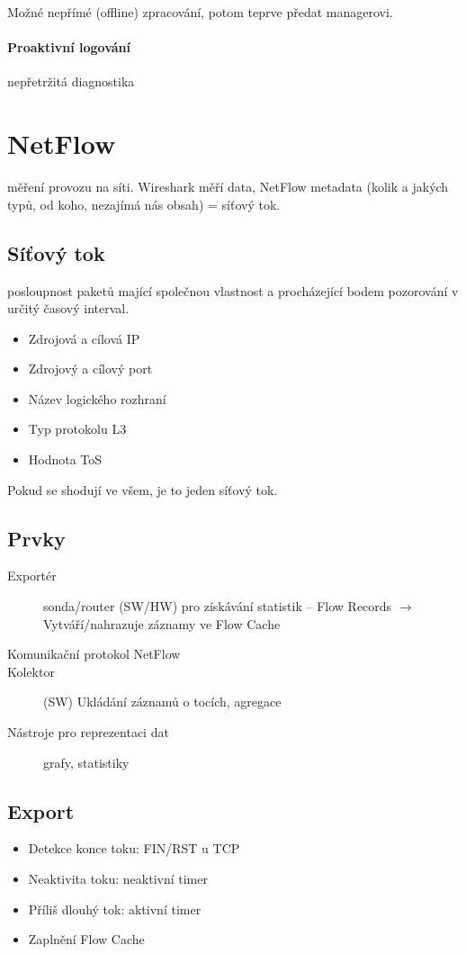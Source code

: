 \documentclass[a4paper, 11pt]{report}
\begin{document}
Možné nepřímé (offline) zpracování, potom teprve předat managerovi.

\paragraph{Proaktivní logování} nepřetržitá diagnostika

\section{NetFlow}
měření provozu na síti. Wireshark měří data, NetFlow metadata (kolik a jakých typů, od koho, nezajímá nás obsah) = síťový tok.

\subsection{Síťový tok}
posloupnost paketů mající společnou vlastnost  a procházející bodem pozorování v určitý časový interval.
\begin{itemize}
	\item Zdrojová a cílová IP
	\item Zdrojový a cílový port
	\item Název logického rozhraní
	\item Typ protokolu L3
	\item Hodnota ToS
\end{itemize}
Pokud se shodují ve všem, je to jeden síťový tok.

\subsection{Prvky}
\begin{description}
	\item[Exportér] sonda/router (SW/HW) pro získávání statistik -- Flow Records $\to$ Vytváří/nahrazuje záznamy ve Flow Cache
	\item[Komunikační protokol NetFlow]
	\item[Kolektor] (SW) Ukládání záznamů o tocích, agregace
	\item[Nástroje pro reprezentaci dat] grafy, statistiky
\end{description}

\subsection{Export}
\begin{itemize}
	\item Detekce konce toku: FIN/RST u TCP
	\item Neaktivita toku: neaktivní timer
	\item Příliš dlouhý tok: aktivní timer
	\item Zaplnění Flow Cache
\end{itemize}
\end{document}
